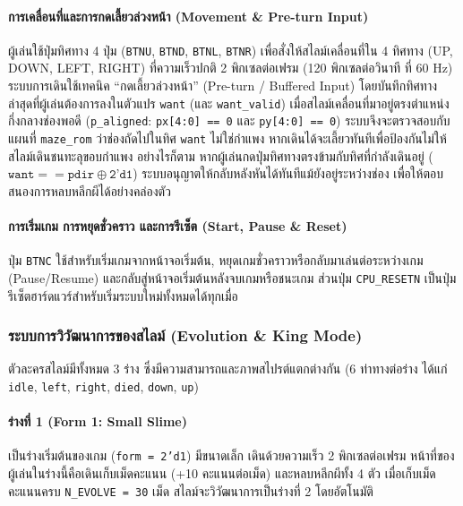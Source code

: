 \documentclass[12pt,a4paper]{article}
\begin{document}
\paragraph{การเคลื่อนที่และการกดเลี้ยวล่วงหน้า (Movement \& Pre-turn Input)}
ผู้เล่นใช้ปุ่มทิศทาง 4 ปุ่ม (\texttt{BTNU}, \texttt{BTND}, \texttt{BTNL}, \texttt{BTNR}) เพื่อสั่งให้สไลม์เคลื่อนที่ใน 4 ทิศทาง (UP, DOWN, LEFT, RIGHT) ที่ความเร็วปกติ 2 พิกเซลต่อเฟรม (120 พิกเซลต่อวินาที ที่ 60 Hz) ระบบการเดินใช้เทคนิค ``กดเลี้ยวล่วงหน้า'' (Pre-turn / Buffered Input) โดยบันทึกทิศทางล่าสุดที่ผู้เล่นต้องการลงในตัวแปร \texttt{want} (และ \texttt{want\_valid}) เมื่อสไลม์เคลื่อนที่มาอยู่ตรงตำแหน่งกึ่งกลางช่องพอดี (\texttt{p\_aligned}: \texttt{px[4:0] == 0} และ \texttt{py[4:0] == 0}) ระบบจึงจะตรวจสอบกับแผนที่ \texttt{maze\_rom} ว่าช่องถัดไปในทิศ \texttt{want} ไม่ใช่กำแพง หากเดินได้จะเลี้ยวทันทีเพื่อป้องกันไม่ให้สไลม์เดินชนทะลุขอบกำแพง อย่างไรก็ตาม หากผู้เล่นกดปุ่มทิศทางตรงข้ามกับทิศที่กำลังเดินอยู่ ($\texttt{want} == \texttt{pdir} \oplus \texttt{2'd1}$) ระบบอนุญาตให้กลับหลังหันได้ทันทีแม้ยังอยู่ระหว่างช่อง เพื่อให้ตอบสนองการหลบหลีกผีได้อย่างคล่องตัว

\paragraph{การเริ่มเกม การหยุดชั่วคราว และการรีเซ็ต (Start, Pause \& Reset)}
ปุ่ม \texttt{BTNC} ใช้สำหรับเริ่มเกมจากหน้าจอเริ่มต้น, หยุดเกมชั่วคราวหรือกลับมาเล่นต่อระหว่างเกม (Pause/Resume) และกลับสู่หน้าจอเริ่มต้นหลังจบเกมหรือชนะเกม ส่วนปุ่ม \texttt{CPU\_RESETN} เป็นปุ่มรีเซ็ตฮาร์ดแวร์สำหรับเริ่มระบบใหม่ทั้งหมดได้ทุกเมื่อ

\subsubsection{ระบบการวิวัฒนาการของสไลม์ (Evolution \& King Mode)}

ตัวละครสไลม์มีทั้งหมด 3 ร่าง ซึ่งมีความสามารถและภาพสไปรต์แตกต่างกัน (6 ท่าทางต่อร่าง ได้แก่ \texttt{idle}, \texttt{left}, \texttt{right}, \texttt{died}, \texttt{down}, \texttt{up})

\paragraph{ร่างที่ 1 (Form 1: Small Slime)}
เป็นร่างเริ่มต้นของเกม (\texttt{form = 2'd1}) มีขนาดเล็ก เดินด้วยความเร็ว 2 พิกเซลต่อเฟรม หน้าที่ของผู้เล่นในร่างนี้คือเดินเก็บเม็ดคะแนน (+10 คะแนนต่อเม็ด) และหลบหลีกผีทั้ง 4 ตัว เมื่อเก็บเม็ดคะแนนครบ \texttt{N\_EVOLVE = 30} เม็ด สไลม์จะวิวัฒนาการเป็นร่างที่ 2 โดยอัตโนมัติ
\end{document}
